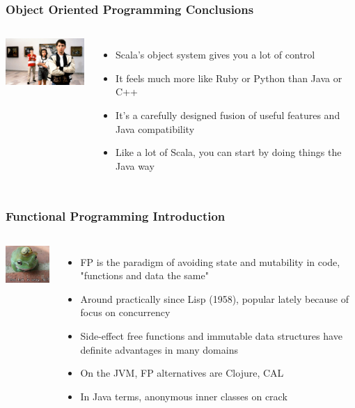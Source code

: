 \documentclass[hyperref={colorlinks=true}]{beamer}
\begin{document}
\begin{frame} 
\frametitle{Object Oriented Programming Conclusions}
\begin{columns}[c]
  \column{1.0in}
    \includegraphics[width=1.5in]{graphics/ferris.jpg} 
  \column{2.0in}
    \begin{itemize}
      \item<1-> Scala's object system gives you a lot of control
      \item<2-> It feels much more like Ruby or Python than Java or C++
      \item<3-> It's a carefully designed fusion of useful features and Java compatibility
      \item<4-> Like a lot of Scala, you can start by doing things the Java way
    \end{itemize}
\end{columns}
\end{frame} 

\begin{frame} 
\frametitle{Functional Programming Introduction}
\begin{columns}[c]
  \column{0.5in}
    \includegraphics[width=1.0in]{graphics/hat.png} 
  \column{2.5in}
    \begin{itemize}
      \item<1-> FP is the paradigm of avoiding state and mutability in code, "functions and data the same"
      \item<2-> Around practically since Lisp (1958), popular lately because of focus on concurrency
      \item<3-> Side-effect free functions and immutable data structures have definite advantages in many domains
      \item<4-> On the JVM, FP alternatives are Clojure, CAL
      \item<5-> In Java terms, anonymous inner classes on crack
    \end{itemize}
\end{columns}
\end{frame} 
\end{document}
